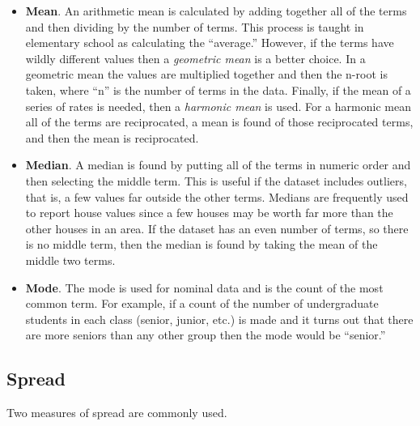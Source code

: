 \begin{itemize}
	\item \textbf{Mean}. An arithmetic mean is calculated by adding together all of the terms and then dividing by the number of terms. This process is taught in elementary school as calculating the ``average.'' However, if the terms have wildly different values then a \textit{geometric mean} is a better choice. In a geometric mean the values are multiplied together and then the n-root is taken, where ``n'' is the number of terms in the data. Finally, if the mean of a series of rates is needed, then a \textit{harmonic mean} is used. For a harmonic mean all of the terms are reciprocated, a mean is found of those reciprocated terms, and then the mean is reciprocated. 

	\item \textbf{Median}. A median is found by putting all of the terms in numeric order and then selecting the middle term. This is useful if the dataset includes outliers, that is, a few values far outside the other terms. Medians are frequently used to report house values since a few houses may be worth far more than the other houses in an area. If the dataset has an even number of terms, so there is no middle term, then the median is found by taking the mean of the middle two terms.

	\item \textbf{Mode}. The mode is used for nominal data and is the count of the most common term. For example, if a count of the number of undergraduate students in each class (senior, junior, etc.) is made and it turns out that there are more seniors than any other group then the mode would be ``senior.''
\end{itemize}

\subsection{Spread}

Two measures of spread are commonly used. 

